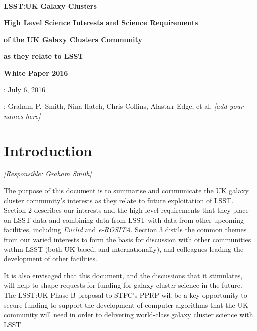 \documentclass[a4paper,11pt]{article}
\begin{document}
\pagestyle{myheadings}

\sloppy

\pagestyle{empty}

~\vspace{70mm}

\centerline{\LARGE\bf LSST:UK Galaxy Clusters}
\bigskip\bigskip\bigskip
\centerline{\Large\bf High Level Science Interests and Science Requirements}
\medskip
\centerline{\Large\bf of the UK Galaxy Clusters Community}
\medskip
\centerline{\Large\bf as they relate to LSST}
\bigskip\bigskip\bigskip
\centerline{\Large\bf White Paper 2016}

\vspace{90mm}

\large
{}: July 6, 2016

: Graham P.\ Smith, Nina Hatch, Chris
Collins, Alastair Edge, et al. {\it [add your names here]}


\newpage
\pagestyle{myheadings}
\setlength{\topmargin}{-10mm}
\setlength{\textheight}{255mm}

\tableofcontents

\newpage

\section{Introduction}

{\it [Responsible: Graham Smith]}

\noindent
The purpose of this document is to summarise and communicate the UK
galaxy cluster community's interests as they relate to future
exploitation of LSST.  Section 2 describes our interests and the high
level requirements that they place on LSST data and combining data
from LSST with data from other upcoming facilities, including
\emph{Euclid} and \emph{e-ROSITA}.  Section 3 distils the common
themes from our varied interests to form the basis for discussion with
other communities within LSST (both UK-based, and internationally),
and colleagues leading the development of other facilities.

It is also envisaged that this document, and the discussions that it
stimulates, will help to shape requests for funding for galaxy cluster
science in the future.  The LSST:UK Phase B proposal to STFC's PPRP
will be a key opportunity to secure funding to support the development
of computer algorithms that the UK community will need in order to
delivering world-class galaxy cluster science with LSST.
\end{document}
